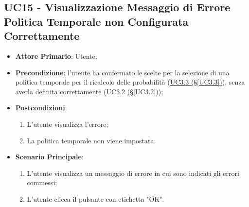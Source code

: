 \subsection{UC15 - Visualizzazione Messaggio di Errore Politica Temporale non Configurata Correttamente}\label{UC15}
\begin{itemize}
\item \textbf{Attore Primario}: Utente;
\item \textbf{Precondizione}: l'utente ha confermato le scelte per la selezione di una politica temporale per il ricalcolo delle probabilità (\hyperref[UC3.3]{UC3.3 (§\ref*{UC3.3})}), senza averla definita correttamente (\hyperref[UC3.2]{UC3.2 (§\ref*{UC3.2})});
\item \textbf{Postcondizioni}: 
	\begin{enumerate}
	\item L'utente visualizza l'errore;
	\item La politica temporale non viene impostata.
	\end{enumerate}
\item \textbf{Scenario Principale}: 
	\begin{enumerate}
	\item L'utente visualizza un messaggio di errore in cui sono indicati gli errori commessi;
	\item L'utente clicca il pulsante con etichetta "OK".
	\end{enumerate}
\end{itemize}



